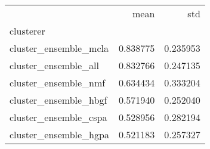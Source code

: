 \begin{tabular}{lrr}
\toprule
{} &      mean &       std \\
clusterer             &           &           \\
\midrule
cluster\_ensemble\_mcla &  0.838775 &  0.235953 \\
cluster\_ensemble\_all  &  0.832766 &  0.247135 \\
cluster\_ensemble\_nmf  &  0.634434 &  0.333204 \\
cluster\_ensemble\_hbgf &  0.571940 &  0.252040 \\
cluster\_ensemble\_cspa &  0.528956 &  0.282194 \\
cluster\_ensemble\_hgpa &  0.521183 &  0.257327 \\
\bottomrule
\end{tabular}

